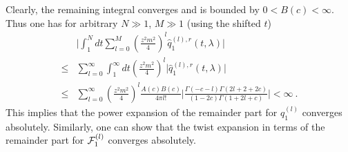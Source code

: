 \documentclass[a4paper,11pt]{article}
\begin{document}
Clearly, the remaining integral converges and is bounded by $0<B(c)<\infty$. Thus one has for arbitrary $N\gg1$, $M\gg 1$  (using the shifted $t$)
\begin{align}
&\bigg|\int_{1}^{N} dt \sum_{l=0}^{M}\left(\frac{z^2m^2}{4}\right)^l \hat q_1^{(l),r}(t,\lambda) \bigg| \nonumber \\ 
\le &\sum_{l=0}^{\infty}\int_{1}^{\infty}dt \left(\frac{z^2m^2}{4}\right)^l \bigg|\hat q_1^{(l),r}(t,\lambda)\bigg| \nonumber \\ 
\le &\sum_{l=0}^{\infty}\left(\frac{z^2m^2}{4}\right)^l \frac{A(c)B(c)}{4\pi l!} \bigg|\frac{\Gamma(-c-l)\Gamma(2l+2+2c)}{(1-2c)\Gamma(1+2l+c)}\bigg|<\infty \ .
\end{align}
This implies that the power expansion of the  remainder part for $q_1^{(l)}$ converges absolutely. Similarly, one can show that the twist expansion in terms of the remainder part for ${\cal F}_1^{(l)}$ converges absolutely.  
\end{document}
